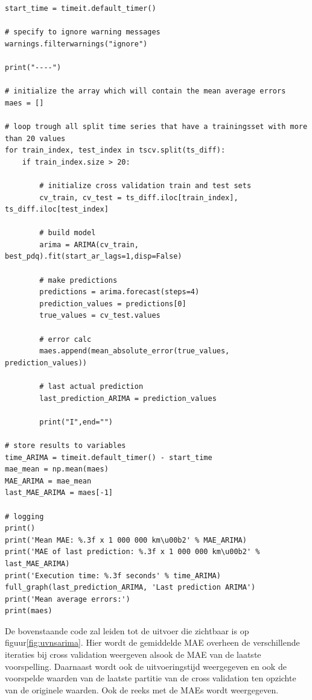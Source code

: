 \begin{verbatim}
start_time = timeit.default_timer()

# specify to ignore warning messages
warnings.filterwarnings("ignore") 

print("----")

# initialize the array which will contain the mean average errors
maes = []

# loop trough all split time series that have a trainingsset with more than 20 values
for train_index, test_index in tscv.split(ts_diff):
    if train_index.size > 20:
    
        # initialize cross validation train and test sets
        cv_train, cv_test = ts_diff.iloc[train_index], ts_diff.iloc[test_index]
        
        # build model
        arima = ARIMA(cv_train, best_pdq).fit(start_ar_lags=1,disp=False)
        
        # make predictions
        predictions = arima.forecast(steps=4)
        prediction_values = predictions[0]
        true_values = cv_test.values
        
        # error calc
        maes.append(mean_absolute_error(true_values, prediction_values))
        
        # last actual prediction 
        last_prediction_ARIMA = prediction_values
        
        print("I",end="")

# store results to variables
time_ARIMA = timeit.default_timer() - start_time
mae_mean = np.mean(maes)
MAE_ARIMA = mae_mean
last_MAE_ARIMA = maes[-1]

# logging
print()
print('Mean MAE: %.3f x 1 000 000 km\u00b2' % MAE_ARIMA)
print('MAE of last prediction: %.3f x 1 000 000 km\u00b2' % last_MAE_ARIMA)
print('Execution time: %.3f seconds' % time_ARIMA)
full_graph(last_prediction_ARIMA, 'Last prediction ARIMA')
print('Mean average errors:')
print(maes)
\end{verbatim}

De bovenstaande code zal leiden tot de uitvoer die zichtbaar is op figuur\ref{fig:uvnsarima}. Hier wordt de gemiddelde MAE overheen de verschillende iteraties bij cross validation weergeven alsook de MAE van de laatste voorspelling. Daarnaast wordt ook de uitvoeringstijd weergegeven en ook de voorspelde waarden van de laatste partitie van de cross validation ten opzichte van de originele waarden. Ook de reeks met de MAEs wordt weergegeven.

